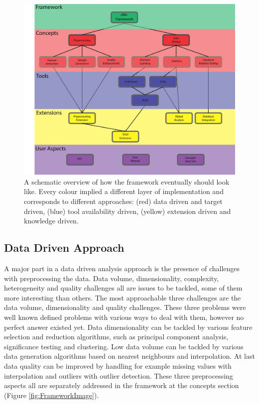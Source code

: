 \documentclass[10pt,a4paper]{article}
\begin{document}
	\begin{figure}
		\includegraphics[width=\textwidth]{FrameworkScheme5i5.png}
		\caption{A schematic overview of how the framework eventually should look like. Every colour implied a different layer of implementation and corresponds to different approaches: (red) data driven and target driven, (blue) tool availability driven, (yellow) extension driven and knowledge driven.}
		\label{fig:FrameworkTree}
	\end{figure}
	
	\subsection{Data Driven Approach}
	\label{subsec:DataDrivenApproach}

	A major part in a data driven analysis approach is the presence of challenges with preprocessing the data. Data volume, dimensionality, complexity, heterogeneity and quality challenges all are issues to be tackled, some of them more interesting than others. The most approachable three challenges are the data volume, dimensionality and quality challenges. These three problems were well known defined problems with various ways to deal with them, however no perfect answer existed yet. Data dimensionality can be tackled by various feature selection and reduction algorithms, such as principal component analysis, significance testing and clustering. Low data volume can be tackled by various data generation algorithms based on nearest neighbours and interpolation. At last data quality can be improved by handling for example missing values with interpolation and outliers with outlier detection. These three preprocessing aspects all are separately addressed in the framework at the concepts section (Figure \ref{fig:FrameworkImage}).
	
\end{document}
